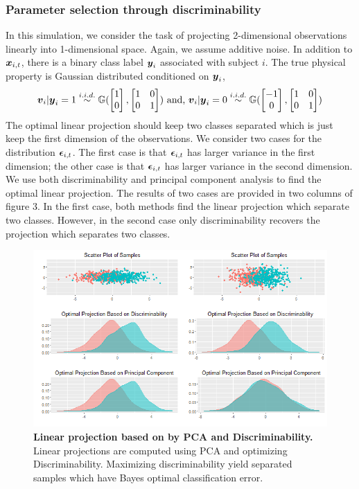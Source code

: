 \documentclass{article}
\begin{document}
\subsubsection{Parameter selection through discriminability  }
In this simulation, we consider the task of projecting 2-dimensional observations linearly into 1-dimensional space. Again, we assume additive noise. In addition to $\boldsymbol{x}_{i,t}$, there is a binary class label $\boldsymbol{y}_{i}$ associated with subject $i$. The true physical property is Gaussian distributed conditioned on $\boldsymbol{y}_i$,
\[\boldsymbol{v}_i|\boldsymbol{y}_i=1 \overset{i.i.d.}{\sim} \mathbb{G}(\begin{bmatrix}1\\0\end{bmatrix},\begin{bmatrix}1& 0\\0& 1\end{bmatrix}) \text{ and, } \boldsymbol{v}_i|\boldsymbol{y}_i=0 \overset{i.i.d.}{\sim} \mathbb{G}(\begin{bmatrix}-1\\0\end{bmatrix},\begin{bmatrix}1& 0\\0& 1\end{bmatrix}) \]
The optimal linear projection should keep two classes separated which is just keep the first dimension of the observations. We consider two cases for the distribution $\boldsymbol{\epsilon}_{i,t}$. The first case is that $\boldsymbol{\epsilon}_{i,t}$ has larger variance in the first dimension; the other case is that $\boldsymbol{\epsilon}_{i,t}$ has larger variance in the second dimension. We use both discriminability and principal component analysis to find the optimal linear projection. The results of two cases are provided in two columns of figure 3. In the first case, both methods find the linear projection which separate two classes. However, in the second case only discriminability recovers the projection which separates two classes. 

\begin{figure}[ht!]
	\includegraphics[width=\linewidth]{../Figs/opt_proj.png}
	\caption{{\bf Linear projection based on by PCA and Discriminability.} Linear projections are computed using PCA and optimizing Discriminability. Maximizing discriminability yield separated samples which have Bayes optimal classification error. }
	\label{fig:3}
\end{figure}
\end{document}
